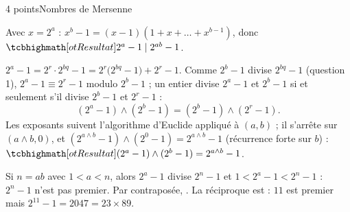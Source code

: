 \begin{corrigeEval}{4 points}{Nombres de Mersenne}
\begin{questions}
  \item Avec $x=2^{a}$ :
    $x^{b}-1=(x-1)(1+x+\dots+x^{b-1})$, donc
    $\res{2^{a}-1\mid2^{ab}-1}$. \pts{1 pt}
  \item $2^{a}-1=2^{r}\cdot2^{bq}-1=2^{r}\bigl(2^{bq}-1\bigr)+2^{r}-1$. Comme
    $2^{b}-1$ divise $2^{bq}-1$ (question 1), $2^{a}-1\equiv2^{r}-1$ modulo
    $2^{b}-1$ ; un entier divise $2^{a}-1$ et $2^{b}-1$ si et seulement s'il
    divise $2^{b}-1$ et $2^{r}-1$ :
    \[(2^{a}-1)\wedge(2^{b}-1)=(2^{b}-1)\wedge(2^{r}-1).\]
    Les exposants suivent l'algorithme d'Euclide appliqué à $(a,b)$ ; il
    s'arrête sur $(a\wedge b,0)$, et $(2^{a\wedge b}-1)\wedge(2^{0}-1)=2^{a\wedge b}-1$
    (récurrence forte sur $b$) :
    $\res{(2^{a}-1)\wedge(2^{b}-1)=2^{a\wedge b}-1}$. 
  \item Si $n=ab$ avec $1<a<n$, alors $2^{a}-1$ divise $2^{n}-1$ et
    $1<2^{a}-1<2^{n}-1$ : $2^{n}-1$ n'est pas premier. Par contraposée,
    . La réciproque
    est  : $11$ est premier mais
    $2^{11}-1=2047=23\times89$. \pts{1 pt}
\end{questions}
\end{corrigeEval}

